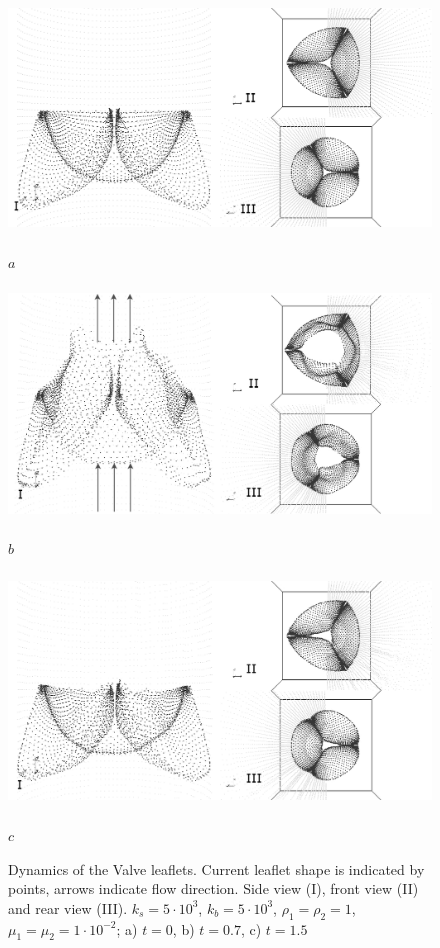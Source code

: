 \documentclass[runningheads,a4paper]{llncs}
\begin{document}
\begin{figure}
\centering
\includegraphics[height=6.2cm]{images/valve_1_gray.png}

$a$

\includegraphics[height=6.2cm]{images/valve_2_gray.png}

$b$

\includegraphics[height=6.2cm]{images/valve_3_gray.png}

$c$

\caption{Dynamics of the Valve leaflets. Current leaflet shape is indicated by points, arrows indicate flow direction.
Side view (I), front view (II) and rear view (III). $k_s = 5 \cdot 10^3$, $k_b = 5 \cdot 10^3$, $\rho_1 = \rho_2 = 1$,
$\mu_1 = \mu_2 = 1 \cdot 10^{-2}$; a) $t=0$, b) $t=0.7$, c) $t=1.5$}
\label{fig:valve}
\end{figure}
\end{document}
